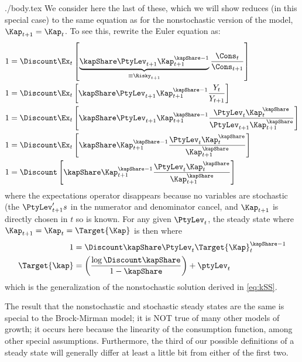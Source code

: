 \documentclass{handout}
\begin{document}
\begin{verbatimwrite}{./body.tex}
We consider here the last of these, which we will show reduces (in this special case) to the same equation as for the nonstochastic version of the model, $\Kap_{t+1}=\Kap_{t}$.  To see this, rewrite the Euler equation as:
\begin{equation*}\begin{gathered}\begin{aligned}
  1 & =  \Discount \Ex_{t} \left[\underbrace{\kapShare \PtyLev_{t+1} \Kap_{t+1}^{\kapShare-1}}_{\equiv \Risky_{t+1}}\frac{\Cons_{t}}{\Cons_{t+1}}\right]
  \\   1 & =  \Discount \Ex_{t} \left[\kapShare \PtyLev_{t+1} \Kap_{t+1}^{\kapShare-1}\frac{Y_{t}}{Y_{t+1}}\right]
  \\   1 & =  \Discount \Ex_{t} \left[\kapShare \PtyLev_{t+1} \Kap_{t+1}^{\kapShare-1}\frac{\PtyLev_{t} \Kap_{t}^{\kapShare}}{\PtyLev_{t+1} \Kap_{t+1}^{\kapShare}}\right]
  \\   1 & =  \Discount \Ex_{t} \left[\kapShare \Kap_{t+1}^{\kapShare-1}\frac{\PtyLev_{t} \Kap_{t}^{\kapShare}}{\Kap_{t+1}^{\kapShare}}\right]
  \\   1 & =  \Discount \left[\kapShare \Kap_{t+1}^{\kapShare-1}\frac{\PtyLev_{t} \Kap_{t}^{\kapShare}}{\Kap_{t+1}^{\kapShare}}\right]
\end{aligned}\end{gathered}\end{equation*}
where the expectations operator disappears because no variables are stochastic (the $\PtyLev_{t+1}'s$ in the numerator and denominator cancel, and $\Kap_{t+1}$ is directly chosen in $t$ so is known.  For any given $\PtyLev_{t}$, the steady state where $\Kap_{t+1}=\Kap_{t}=\Target{\Kap}$ is then where
\begin{equation*}\begin{gathered}\begin{aligned}
  1 & =  \Discount \kapShare \PtyLev_{t} \Target{\Kap}_{t}^{\kapShare-1}
\\ \Target{\kap} & =  \left(\frac{ \log \Discount \kapShare }{1-\kapShare}\right)+\ptyLev_{t}
\end{aligned}\end{gathered}\end{equation*}
which is the generalization of the nonstochastic solution derived in \eqref{eq:kSS}.

The result that the nonstochastic and stochastic steady states are the same is special to the Brock-Mirman model; it is NOT true of many other models of growth; it occurs here because the linearity of the consumption function, among other special assumptions.  Furthermore, the third of our possible definitions of a steady state will generally differ at least a little bit from either of the first two.

\renewcommand\refname{\noindent{\href{http://www.econ2.jhu.edu/people/ccarroll/public/lecturenotes/DSGEModels/BrockMirman/BrockMirman.bib}{\large References {\small (click to download \texttt{.bib} file)}}}}



\end{verbatimwrite}

\end{document}
